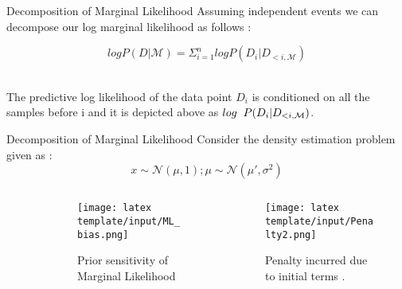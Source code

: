 \documentclass[t, aspectratio=169]{beamer}
\begin{document}
 \begin{frame}{Decomposition of Marginal Likelihood}
 \vspace{0.7cm}
  Assuming independent events we can decompose our log marginal likelihood as follows \cite{Lofti}:\\

 \vspace{1.5cm}


\[log P(D|\mathcal{M}) = \Sigma_{i = 1}^n log P(D_i|D_{<i, \mathcal{M}})\]\\

 \vspace{1.5cm}

The predictive log likelihood of the data point \(D_i\) is conditioned on all the samples before i and it is depicted above as \(log \hspace{0.2cm}P(D_i|D_{<i, \mathcal{M}})\). 

 \end{frame}  
 

\begin{frame}{Decomposition of Marginal Likelihood}
 Consider the density estimation problem given as : \\
\[x \sim \mathcal{N}(\mu, 1); \mu \sim \mathcal{N}(\mu', \sigma^2)\]

 \begin{columns}[c]\

\begin{column}{0.1\textwidth}

\end{column}
\begin{column}{0.35\textwidth}

 \begin{figure}

 \texttt{[image: latex template/input/ML\_bias.png]}
 \caption{Prior sensitivity of Marginal Likelihood \cite{Lofti}}
    \end{figure}
\end{column}

   \begin{column}{.55\textwidth}
     \begin{figure}
         \centering
        \texttt{[image: latex template/input/Penalty2.png]}
        \caption{Penalty incurred due to initial terms \cite{Lofti}.}
    \end{figure}
   \end{column}
 \end{columns}
 \end{frame}
\end{document}
